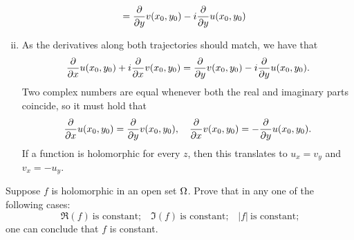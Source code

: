 \documentclass[12pt]{memoir}
\begin{document}
\begin{ptcbr}
\begin{enumerate}[i)]
\begin{align*}
        &=\pdv{y}v(x_0,y_0)-i\pdv{y}u(x_0,y_0)
    \end{align*}
    \item As the derivatives along both trajectories should match, we have that 
    $$\pdv{x}u(x_0,y_0)+i\pdv{x}v(x_0,y_0)=\pdv{y}v(x_0,y_0)-i\pdv{y}u(x_0,y_0).$$
    Two complex numbers are equal whenever both the real and imaginary parts coincide, so it must hold that 
    $$\pdv{x}u(x_0,y_0)=\pdv{y}v(x_0,y_0),\quad \pdv{x}v(x_0,y_0)=-\pdv{y}u(x_0,y_0).$$
    If a function is holomorphic for every $z$, then this translates to $u_x=v_y$ and $v_x=-u_y$.
\end{enumerate}
\end{ptcbr}

\begin{Ej}
    Suppose $f$ is holomorphic in an open set $\Omega$. Prove that in any one of the following cases:
     $$\Re(f)\ \text{is constant;}\quad \Im(f)\ \text{is constant;}\quad |f|\ \text{is constant;}$$
    one can conclude that $f$ is constant.
\end{Ej}
\end{document}
